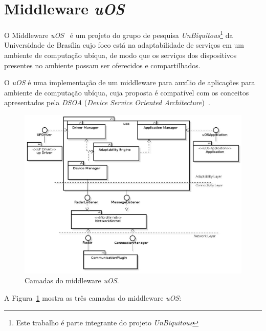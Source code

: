\section{Middleware \textit{uOS}}
\label{uos}

	O Middleware \textit{uOS}~\cite{fabriciobuzzeto} é um projeto do grupo de pesquisa \textit{UnBiquitous}\footnote{Este trabalho é parte integrante do projeto \textit{UnBiquitous}} da Universidade de Brasília cujo foco está na adaptabilidade de serviços em um ambiente de computação ubíqua, de modo que os serviços dos dispositivos presentes no ambiente possam ser oferecidos e compartilhados.

	 O \textit{uOS} é uma implementação de um middleware para auxílio de aplicações para ambiente de computação ubíqua, cuja proposta é compatível com os conceitos apresentados pela \textit{DSOA} (\textit{Device Service Oriented Architecture})~\cite{fabriciobuzzeto}. 

	 \begin{figure}[htb]
		\begin{center}
			\includegraphics[scale=0.45]{figuras/4.ProblemaEProposta/uoscamadas.jpg}
		\end{center}
		\caption{Camadas do middleware \textit{uOS}.}
		\label{fig:arq-uos}
	\end{figure}

	A Figura~\ref{fig:arq-uos} mostra as três camadas do middleware \textit{uOS}:

